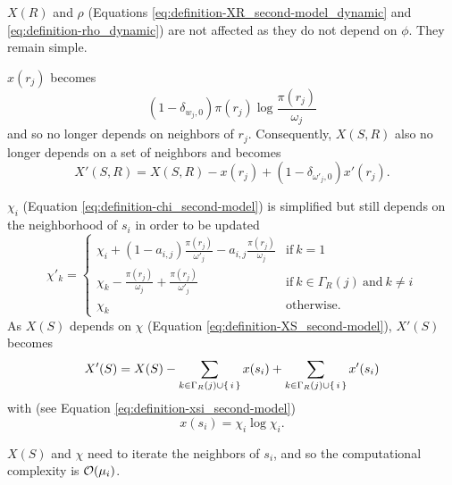 $X(R)$ and $\rho$ (Equations \eqref{eq:definition-XR_second-model_dynamic} and \eqref{eq:definition-rho_dynamic}) are not affected as they do not depend on $\phi$.
They remain simple.

$x(r_j)$ becomes
\begin{equation}
  \label{eq:definition-xrj_second-model_dynamic-phi0}
  (1-\delta_{w_j,0}) \pi(r_j)\log\frac{\pi(r_j)}{\omega_j}
\end{equation}
and so no longer depends on neighbors of $r_j$.
Consequently, $X(S,R)$ also no longer depends on a set of neighbors and becomes
\begin{equation}
  \label{eq:definition-XSR_second-model_dynamic-phi0}
  X'(S,R) = X(S,R) - x(r_j) + (1-\delta_{\omega'_j,0}) x'(r_j).
\end{equation}

$\chi_i$ (Equation \eqref{eq:definition-chi_second-model}) is simplified but still depends on the neighborhood of $s_i$ in order to be updated
\begin{equation}
  \label{eq:definition-chi_second-model_dynamic-phi0}
  \chi'_k = \begin{cases}
    \chi_i + (1-a_{i,j}) \frac{\pi(r_j)}{\omega'_j} - a_{i,j} \frac{\pi(r_j)}{\omega_j} & \text{if}~k=1 \\
    \chi_k - \frac{\pi(r_j)}{\omega_j} + \frac{\pi(r_j)}{\omega'_j} & \text{if}~k\in\Gamma_R(j)~\text{and}~k\neq i \\
    \chi_k & \text{otherwise}.
  \end{cases}
\end{equation}
As $X(S)$ depends on $\chi$ (Equation \eqref{eq:definition-XS_second-model}), $X'(S)$ becomes
\begin{equation}
  \label{eq:definition-XS_second-model_dynamic-phi0}
  X'(S) = X(S) - \sum_{k \in \Gamma_R(j) \cup \{\,i\,\}} x(s_i) + \sum_{k \in \Gamma_R(j) \cup \{\,i\,\}} x'(s_i)
\end{equation}
with (see Equation \eqref{eq:definition-xsi_second-model})
\begin{equation}
  \label{eq:definition-xsi_second-model_dynamic-phi0}
  x(s_i) = \chi_i \log \chi_i.
\end{equation}

$X(S)$ and $\chi$ need to iterate the neighbors of $s_i$, and so the computational complexity is $\mathcal{O}(\mu_i)$.


